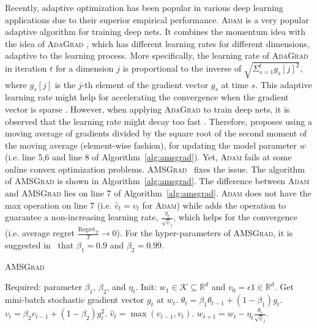 \documentclass[11pt]{article}
\def\K{\mathcal{K}}
\theoremstyle{k}
\begin{document}
Recently, adaptive optimization has been popular in various deep learning applications due to their superior empirical performance. \textsc{Adam} \cite{KB15} is a very popular adaptive algorithm for training deep nets.
It combines the momentum idea \cite{P64} with the idea of \textsc{AdaGrad} \cite{DHS11},
which has different learning rates for different dimensions, adaptive to the learning process. More specifically, the learning rate of \textsc{AdaGrad} in iteration $t$ for a dimension $j$ is proportional to the inverse of $\sqrt{ \Sigma_{s=1}^t g_s[j]^2 }$,
where $g_s[j]$ is the $j$-th element of the gradient vector $g_s$ 
at time $s$.
This adaptive learning rate might help for accelerating the convergence when the gradient vector is sparse \cite{DHS11}. However,
when applying \textsc{AdaGrad} to train deep nets,
it is observed that the learning rate might decay too fast \cite{KB15}.
Therefore, \cite{KB15} proposes using a moving average of gradients 
divided by the square root of the second moment of the moving average (element-wise fashion), for updating the model parameter $w$ (i.e. line 5,6 and line 8 of Algorithm~\ref{alg:amsgrad}).
Yet, \textsc{Adam} \cite{KB15} fails at some online convex optimization problems. \textsc{AMSGrad}~\cite{RKK18} fixes the issue. 
The algorithm of \textsc{AMSGrad} is shown in Algorithm~\ref{alg:amsgrad}.
The difference between \textsc{Adam} and 
\textsc{AMSGrad} lies on line 7 of Algorithm~\ref{alg:amsgrad}.
\textsc{Adam} does not have the max operation on line 7 (i.e. $\hat{v}_t = v_t$ for \textsc{Adam}) while
\cite{RKK18} adds the operation to guarantee a non-increasing learning rate,
$\frac{\eta_t }{ \sqrt{\hat{v}}_t }$,
which helps for the convergence (i.e. average regret $\frac{\text{Regret}_T}{T} \rightarrow 0$).
For the hyper-parameters of \textsc{AMSGrad}, it is suggested in~\cite{RKK18} that $\beta_1=0.9$ and $\beta_2=0.99$.


\begin{algorithm}[H]
\begin{algorithmic}[1]
\small
\caption{\textsc{AMSGrad} \cite{RKK18}} \label{alg:amsgrad}
\STATE Required: parameter $\beta_1$, $\beta_2$, and $\eta_t$. 
\STATE Init: $w_{1} \in \K \subseteq \mathbb R^d $ and $v_{0} = \epsilon 1 \in \mathbb R^{d}$.
\STATE Get mini-batch stochastic gradient vector $g_t$ at $w_t$.
\STATE $\theta_t = \beta_1 \theta_{t-1} + (1 - \beta_1) g_t$.
\STATE $v_t = \beta_2 v_{t-1} + (1 - \beta_2) g_t^2$. 
\STATE $\hat{v}_t = \max( \hat{v}_{t-1} , v_t )$. 
\STATE $w_{t+1} = w_t - \eta_t \frac{\theta_t}{ \sqrt{\hat{v}}_t }$.
\ENDFOR
\end{algorithmic}
\end{algorithm}
\end{document}
